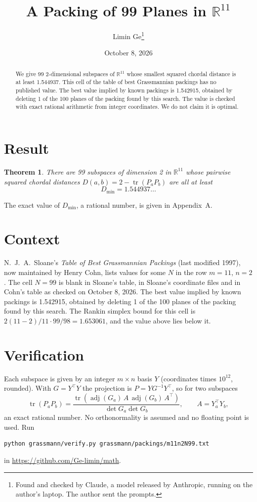 \documentclass[11pt,a4paper]{article}
\title{A Packing of 99 Planes in $\mathbb{R}^{11}$}
\author{Limin Ge\thanks{Found and checked by Claude, a model released by Anthropic, running on the author's laptop. The author sent the prompts.}}
\date{October 8, 2026}
\newtheorem*{theorem}{Theorem}
\begin{document}
\maketitle
\begin{abstract}
We give 99 2-dimensional subspaces of $\mathbb{R}^{11}$ whose smallest squared chordal distance is at least 1.544937. This cell of the table of best Grassmannian packings has no published value. The best value implied by known packings is 1.542915, obtained by deleting 1 of the 100 planes of the packing found by this search. The value is checked with exact rational arithmetic from integer coordinates. We do not claim it is optimal.
\end{abstract}

\section{Result}
\begin{theorem}
There are 99 subspaces of dimension 2 in $\mathbb{R}^{11}$ whose pairwise squared chordal distances $D(a,b) = 2 - \operatorname{tr}(P_aP_b)$ are all at least
\[ D_{\min} = 1.544937\ldots \]
\end{theorem}
The exact value of $D_{\min}$, a rational number, is given in Appendix~A.


\section{Context}
N.~J.~A.~Sloane's \emph{Table of Best Grassmannian Packings} (last modified 1997), now maintained by Henry Cohn, lists values for some $N$ in the row $m=11$, $n=2$. The cell $N=99$ is blank in Sloane's table, in Sloane's coordinate files and in Cohn's table as checked on October 8, 2026. The best value implied by known packings is 1.542915, obtained by deleting 1 of the 100 planes of the packing found by this search. The Rankin simplex bound for this cell is $2(11-2)/11\cdot 99/98 = 1.653061$, and the value above lies below it.


\section{Verification}
Each subspace is given by an integer $m\times n$ basis $Y$ (coordinates times $10^{12}$, rounded). With $G=Y^\top Y$ the projection is $P=YG^{-1}Y^\top$, so for two subspaces
\[ \operatorname{tr}(P_aP_b)=\frac{\operatorname{tr}(\operatorname{adj}(G_a)\,A\,\operatorname{adj}(G_b)\,A^\top)}{\det G_a\det G_b},\qquad A=Y_a^\top Y_b, \]
an exact rational number. No orthonormality is assumed and no floating point is used. Run
\begin{verbatim}
python grassmann/verify.py grassmann/packings/m11n2N99.txt
\end{verbatim}
in \url{https://github.com/Ge-limin/math}.
\end{document}
